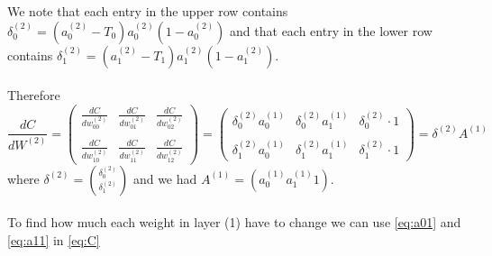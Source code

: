 \documentclass{article}
\begin{document}
We note that each entry in the upper row contains $\delta_0^{(2)} = (a_0^{(2)}-T_0)a_0^{(2)}(1-a_0^{(2)})$ and that each entry in the lower row contains $\delta_1^{(2)} = (a_1^{(2)}-T_1)a_1^{(2)}(1-a_1^{(2)})$.
\\\\
Therefore $$\frac{dC}{dW^{(2)}} = 
\begin{pmatrix}
\frac{dC}{dw_{00}^{(2)}} & \frac{dC}{dw_{01}^{(2)}} & \frac{dC}{dw_{02}^{(2)}}
\\\\
\frac{dC}{dw_{10}^{(2)}} & \frac{dC}{dw_{11}^{(2)}} & \frac{dC}{dw_{12}^{(2)}} 
\end{pmatrix} = \begin{pmatrix}
\delta_0^{(2)}a_0^{(1)} & \delta_0^{(2)}a_1^{(1)} & \delta_0^{(2)} \cdot 1
\\\\
\delta_1^{(2)}a_0^{(1)} & \delta_1^{(2)}a_1^{(1)} & \delta_1^{(2)} \cdot 1
\end{pmatrix} = \delta^{(2)}A^{(1)}
$$
where $\delta^{(2)} = \binom{\delta_0^{(2)}}{\delta_1^{(2)}}$
and we had $A^{(1)} = (a_0^{(1)} a_1^{(1)} 1)$.
\\\\
To find how much each weight in layer (1) have to change we can use \eqref{eq:a01} and \eqref{eq:a11} in \eqref{eq:C}
\end{document}
